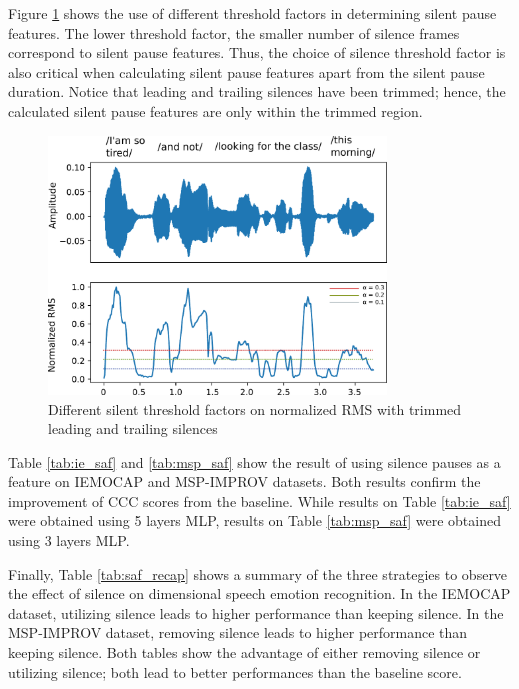 Figure \ref{fig:msp_threshold} shows the use of different threshold factors in
determining silent pause features. The lower threshold factor, the smaller
number of silence frames correspond to silent pause features. Thus, the choice
of silence threshold factor is also critical when calculating silent pause
features apart from the silent pause duration. Notice that leading and trailing
silences have been trimmed; hence, the calculated silent pause features are
only within the trimmed region.

\begin{figure}[htbp]
  \centering
  \includegraphics[width=0.8\textwidth]{../fig/msp_sa01a-trimmed.pdf}
  \caption{Different silent threshold factors on normalized RMS with 
  trimmed leading and trailing silences}
  \label{fig:msp_threshold}
\end{figure}


Table \ref{tab:ie_saf} and \ref{tab:msp_saf} show the result of using silence
pauses as a feature on IEMOCAP and MSP-IMPROV datasets. Both results confirm
the improvement of CCC scores from the baseline. While results on Table
\ref{tab:ie_saf} were obtained using 5 layers MLP, results on Table
\ref{tab:msp_saf} were obtained using 3 layers MLP.

Finally, Table \ref{tab:saf_recap} shows a summary of the three strategies to
observe the effect of silence on dimensional speech emotion recognition. In the
IEMOCAP dataset, utilizing silence leads to higher performance than keeping
silence. In the MSP-IMPROV dataset, removing silence leads to higher
performance than keeping silence. Both tables show the advantage of either
removing silence or utilizing silence; both lead to better performances than
the baseline score.

